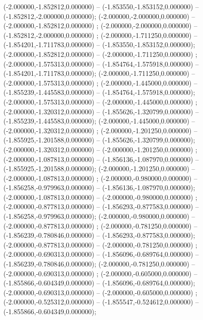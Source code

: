 (-2.000000,-1.852812,0.000000) -- (-1.853550,-1.853152,0.000000) -- (-1.852812,-2.000000,0.000000);
 (-2.000000,-2.000000,0.000000) -- (-2.000000,-1.852812,0.000000) ;
 (-2.000000,-2.000000,0.000000) -- (-1.852812,-2.000000,0.000000) ;
 (-2.000000,-1.711250,0.000000) -- (-1.854201,-1.711783,0.000000) -- (-1.853550,-1.853152,0.000000);
 (-2.000000,-1.852812,0.000000) -- (-2.000000,-1.711250,0.000000) ;
 (-2.000000,-1.575313,0.000000) -- (-1.854764,-1.575918,0.000000) -- (-1.854201,-1.711783,0.000000);
 (-2.000000,-1.711250,0.000000) -- (-2.000000,-1.575313,0.000000) ;
 (-2.000000,-1.445000,0.000000) -- (-1.855239,-1.445583,0.000000) -- (-1.854764,-1.575918,0.000000);
 (-2.000000,-1.575313,0.000000) -- (-2.000000,-1.445000,0.000000) ;
 (-2.000000,-1.320312,0.000000) -- (-1.855626,-1.320799,0.000000) -- (-1.855239,-1.445583,0.000000);
 (-2.000000,-1.445000,0.000000) -- (-2.000000,-1.320312,0.000000) ;
 (-2.000000,-1.201250,0.000000) -- (-1.855925,-1.201588,0.000000) -- (-1.855626,-1.320799,0.000000);
 (-2.000000,-1.320312,0.000000) -- (-2.000000,-1.201250,0.000000) ;
 (-2.000000,-1.087813,0.000000) -- (-1.856136,-1.087970,0.000000) -- (-1.855925,-1.201588,0.000000);
 (-2.000000,-1.201250,0.000000) -- (-2.000000,-1.087813,0.000000) ;
 (-2.000000,-0.980000,0.000000) -- (-1.856258,-0.979963,0.000000) -- (-1.856136,-1.087970,0.000000);
 (-2.000000,-1.087813,0.000000) -- (-2.000000,-0.980000,0.000000) ;
 (-2.000000,-0.877813,0.000000) -- (-1.856293,-0.877583,0.000000) -- (-1.856258,-0.979963,0.000000);
 (-2.000000,-0.980000,0.000000) -- (-2.000000,-0.877813,0.000000) ;
 (-2.000000,-0.781250,0.000000) -- (-1.856239,-0.780846,0.000000) -- (-1.856293,-0.877583,0.000000);
 (-2.000000,-0.877813,0.000000) -- (-2.000000,-0.781250,0.000000) ;
 (-2.000000,-0.690313,0.000000) -- (-1.856096,-0.689764,0.000000) -- (-1.856239,-0.780846,0.000000);
 (-2.000000,-0.781250,0.000000) -- (-2.000000,-0.690313,0.000000) ;
 (-2.000000,-0.605000,0.000000) -- (-1.855866,-0.604349,0.000000) -- (-1.856096,-0.689764,0.000000);
 (-2.000000,-0.690313,0.000000) -- (-2.000000,-0.605000,0.000000) ;
 (-2.000000,-0.525312,0.000000) -- (-1.855547,-0.524612,0.000000) -- (-1.855866,-0.604349,0.000000);
